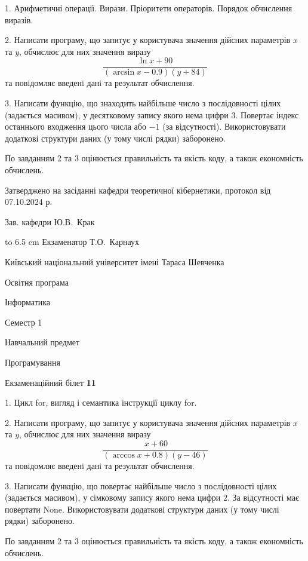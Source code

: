 \documentclass[12pt, ukrainian]{article}
\begin{document}
{%
1. Арифметичні операції. Вирази. Пріоритети операторів. Порядок обчислення виразів.%
\par
2. Написати програму, що запитує у користувача значення дійсних параметрів $x$ та $y$, обчислює для них значення виразу 
$$\frac{\ln x + 90}{(\arcsin x - 0.9) (y + 84)}$$ 
та повiдомляє введенi данi та результат обчислення.

\par
3. Написати функцію, що знаходить найбільше число з послідовності цілих (задається масивом), у десятковому запису якого нема цифри 3. Повертає індекс останнього входження цього числа або $-1$ (за відсутності). Використовувати додаткові структури даних (у тому числі рядки) заборонено.

По завданням 2 та 3 оцінюється правильність та якість коду, а також економність обчислень.

}
{\smallskip\smallskip \begin {scriptsize} Затверджено на засіданні кафедри теоретичної кібернетики, протокол   від   07.10.2024 р.\par\smallskip\smallskip\smallskip\smallskip
{\parbox {6.5 cm} {Зав. кафедри \dotfill Ю.В.~Крак}}\hspace {0.7cm} {\hbox to 6.5 cm { Екзаменатор \dotfill Т.О.~Карнаух}} \end{scriptsize}}
\vspace{0.9cm}
{{\begin {scriptsize}\par
{ \center  Київський національний університет імені Тараса Шевченка \par}
{\parbox {5 cm}{Освітня програма \hfill}{\parbox {7 cm}{Інформатика\hfill}}\parbox {6 cm}{\hfill Семестр 1}}\par
{\parbox {5 cm} {Навчальний предмет \hfill}\parbox {7 cm}{Програмування \hfill}\parbox {6cm}{\hfill}\par}\vspace{-15pt} \end{scriptsize}}{\center Екзаменаційний білет \No \textbf { 11 }\par}}
{%
1. Цикл for, вигляд і семантика інструкції циклу for.%
\par
2. Написати програму, що запитує у користувача значення дійсних параметрів $x$ та $y$, обчислює для них значення виразу 
$$\frac{\ x + 60}{(\arccos x + 0.8) (y - 46)}$$ 
та повiдомляє введенi данi та результат обчислення.

\par
3. Написати функцію, що повертає найбільше число з послідовності цілих (задається масивом), у сімковому запису якого нема цифри 2. За відсутності має повертати None. Використовувати додаткові структури даних (у тому числі рядки) заборонено.

По завданням 2 та 3 оцінюється правильність та якість коду, а також економність обчислень.

}
\end{document}
